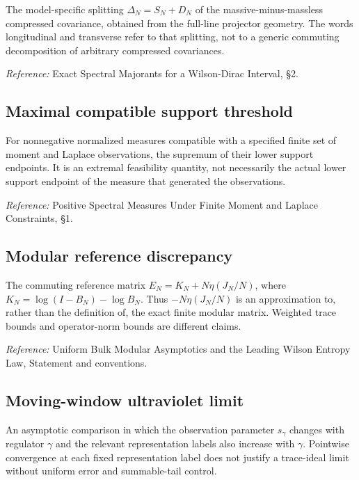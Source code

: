 \documentclass[
  10pt,
  a4paper,
]{article}
\begin{document}
The model-specific splitting \(\Delta_N=S_N+D_N\) of the massive-minus-massless compressed covariance, obtained from the full-line projector geometry. The words longitudinal and transverse refer to that splitting, not to a generic commuting decomposition of arbitrary compressed covariances.

\nopagebreak[4]

\emph{Reference:} Exact Spectral Majorants for a Wilson-Dirac Interval, §2.

\subsection{Maximal compatible support threshold}\label{maximal-compatible-support-threshold}

For nonnegative normalized measures compatible with a specified finite set of moment and Laplace observations, the supremum of their lower support endpoints. It is an extremal feasibility quantity, not necessarily the actual lower support endpoint of the measure that generated the observations.

\nopagebreak[4]

\emph{Reference:} Positive Spectral Measures Under Finite Moment and Laplace Constraints, §1.

\subsection{Modular reference discrepancy}\label{modular-reference-discrepancy}

The commuting reference matrix \(E_N=K_N+N\eta(J_N/N)\), where \(K_N=\log(I-B_N)-\log B_N\). Thus \(-N\eta(J_N/N)\) is an approximation to, rather than the definition of, the exact finite modular matrix. Weighted trace bounds and operator-norm bounds are different claims.

\nopagebreak[4]

\emph{Reference:} Uniform Bulk Modular Asymptotics and the Leading Wilson Entropy Law, Statement and conventions.

\subsection{Moving-window ultraviolet limit}\label{moving-window-ultraviolet-limit}

An asymptotic comparison in which the observation parameter \(s_\gamma\) changes with regulator \(\gamma\) and the relevant representation labels also increase with \(\gamma\). Pointwise convergence at each fixed representation label does not justify a trace-ideal limit without uniform error and summable-tail control.
\end{document}
